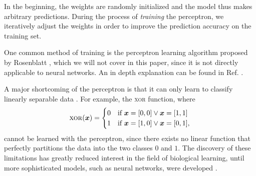 In the beginning, the weights are randomly initialized and the model thus makes arbitrary predictions. During the process of \emph{training} the perceptron, we iteratively adjust the weights in order to improve the prediction accuracy on the training set.

One common method of training is the perceptron learning algorithm proposed by Rosenblatt \cite{Rosenblatt1958386}, which we will not cover in this paper, since it is not directly applicable to neural networks. An in depth explanation can be found in Ref. \cite[Ch.\,8,\,pp.\,265-267]{DBLP:books/lib/Murphy12}.

A major shortcoming of the perceptron is that it can only learn to classify linearly separable data \cite{DBLP:books/daglib/0066902}. For example, the \textsc{xor} function, where 
\begin{equation}
\text{\textsc{xor}}(\bm{x}) = 
\begin{cases} 0 & \text{if }\bm{x} = [0,0] \lor \bm{x} = [1,1] 
			\\1 & \text{if }\bm{x} = [1,0] \lor \bm{x} = [0,1],
\end{cases}
\end{equation}
cannot be learned with the perceptron, since there exists no linear function that perfectly partitions the data into the two classes $0$ and $1$. The discovery of these limitations has greatly reduced interest in the field of biological learning, until more sophisticated models, such as neural networks, were developed \cite[Ch.\,1,\,pp.\,12-18]{DBLP:books/daglib/0040158}.